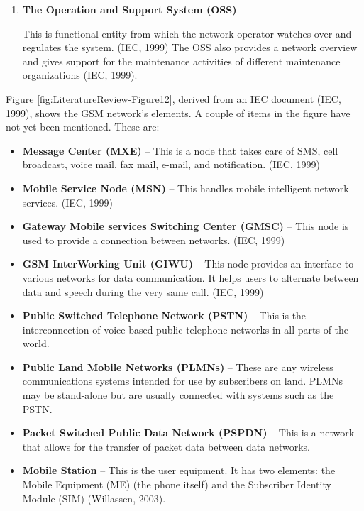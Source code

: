 \documentclass[12pt,svgnames,smaller]{article} %
\begin{document}
\begin{enumerate}
		
		\item \textbf{The Operation and Support System (OSS)}
		
		This is functional entity from which the network operator watches over and regulates the system. (IEC, 1999) The OSS also provides a network overview and gives support for the maintenance activities of different maintenance organizations (IEC, 1999).
		
		
	\end{enumerate}
	
	Figure \ref{fig:LiteratureReview-Figure12}, derived from an IEC document (IEC, 1999), shows the GSM network’s elements. A couple of items in the figure have not yet been mentioned. These are:
	
	\begin{itemize}
		\item \textbf{Message Center (MXE)} – This is a node that takes care of SMS, cell broadcast, voice mail, fax mail, e-mail, and notification. (IEC, 1999) 
		\item \textbf{Mobile Service Node (MSN)} – This handles mobile intelligent network services. (IEC, 1999)
		\item \textbf{Gateway Mobile services Switching Center (GMSC)} – This node is used to provide a connection between networks. (IEC, 1999)
		\item \textbf{GSM InterWorking Unit (GIWU)} – This node provides an interface to various networks for data communication. It helps users to alternate between data and speech during the very same call. (IEC, 1999)
		\item \textbf{Public Switched Telephone Network (PSTN)} – This is the interconnection of voice-based public telephone networks in all parts of the world.
		\item \textbf{Public Land Mobile Networks (PLMNs)} – These are any wireless communications systems intended for use by subscribers on land. PLMNs may be stand-alone but are usually connected with systems such as the PSTN.
		\item \textbf{Packet Switched Public Data Network (PSPDN)} – This is a network that allows for the transfer of packet data between data networks.
		\item \textbf{Mobile Station} – This is the user equipment. It has two elements: the Mobile Equipment (ME) (the phone itself) and the Subscriber Identity Module (SIM) (Willassen, 2003). 
	\end{itemize}
	
\end{document}
